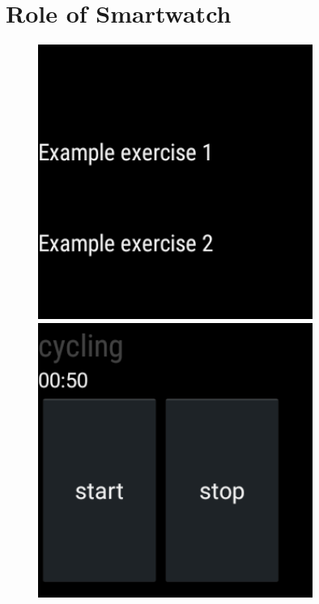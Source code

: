 \section{Role of Smartwatch}

\begin{figure}[b!]
  \centering
    \begin{minipage}{0.20\textwidth}
      \centering
        \includegraphics[width=0.80\textwidth]{00_resources/figures/Android_Watch_ListView.png}
    \end{minipage}
    \begin{minipage}{0.20\textwidth}
      \centering
        \includegraphics[width=0.80\textwidth]{00_resources/figures/Android_Watch_RecordView.png}

\end{minipage}
\end{figure}
